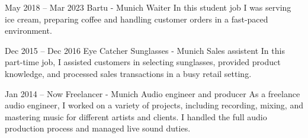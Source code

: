 \jobentry
	{May 2018 -- Mar 2023} %
	{} %
	{Bartu - Munich} %
	{Waiter} %
	{In this student job I was serving ice cream, preparing coffee and handling customer orders in a fast-paced environment.} %

\jobentry
	{Dec 2015 -- Dec 2016} %
	{} %
	{Eye Catcher Sunglasses - Munich} %
	{Sales assistent} %
	{In this part-time job, I assisted customers in selecting sunglasses, provided product knowledge, and processed sales transactions in a busy retail setting.} %

\jobentry
	{Jan 2014 -- Now} %
	{} %
	{Freelancer - Munich} %
	{Audio engineer and producer} %
	{As a freelance audio engineer, I worked on a variety of projects, including recording, mixing, and mastering music for different artists and clients. I handled the full audio production process and managed live sound duties.}%